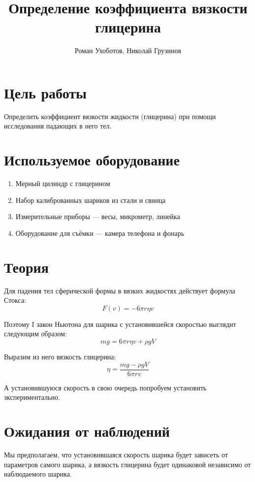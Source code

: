 \documentclass[a4paper, 12pt]{article}
\title{Определение коэффициента вязкости глицерина}
\author{Роман Ухоботов, Николай Грузинов}
\date{}%
\begin{document}
    \maketitle


    \section{Цель работы}\label{sec:target}
    Определить коэффициент вязкости жидкости (глицерина) при помощи исследования падающих в него тел.


    \section{Используемое оборудование}\label{sec:tools}
    \begin{enumerate}
        \item Мерный цилиндр с глицерином
        \item Набор калиброванных шариков из стали и свинца
        \item Измерительные приборы --- весы, микрометр, линейка
        \item Оборудование для съёмки --- камера телефона и фонарь
    \end{enumerate}


    \section{Теория}\label{sec:theory}

    Для падения тел сферической формы в вязких жидкостях действует формула Стокса:
    \[F(v) = -6 \pi r \eta v\]

    Поэтому I закон Ньютона для шарика с установившейся скоростью выглядит следующим образом:
    \[m g = 6 \pi r \eta v + \rho g V\]

    Выразим из него вязкость глицерина:
    \[ \eta = \frac{m g - \rho g V}{6 \pi r v} \]

    А установившуюся скорость в свою очередь попробуем установить экспериментально.


    \section{Ожидания от наблюдений}

    Мы предполагаем, что установившаяся скорость шарика будет зависеть от параметров самого шарика,
    а вязкость глицерина будет одинаковой независимо от наблюдаемого шарика.
\end{document}

